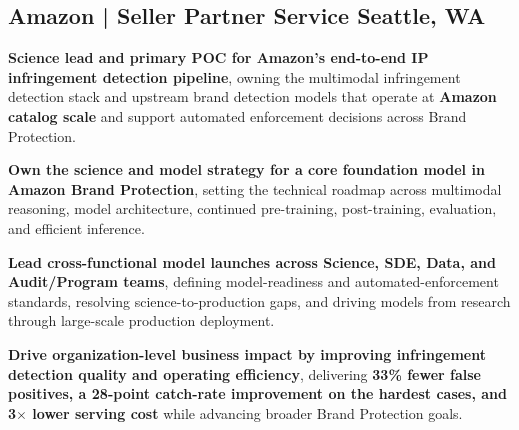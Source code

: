 \documentclass[]{Keval-resume}
\begin{document}
\subsection{Amazon | Seller Partner Service \hfill \normalfont S\lowercase{eattle}, WA}
\begin{cvitems}

\item
{\textbf{Science lead and primary POC for Amazon's end-to-end IP infringement detection pipeline}, owning the multimodal infringement detection stack and upstream brand detection models that operate at \textbf{Amazon catalog scale} and support automated enforcement decisions across Brand Protection.}

\item
{\textbf{Own the science and model strategy for a core foundation model in Amazon Brand Protection}, setting the technical roadmap across multimodal reasoning, model architecture, continued pre-training, post-training, evaluation, and efficient inference.}

\item
{\textbf{Lead cross-functional model launches across Science, SDE, Data, and Audit/Program teams}, defining model-readiness and automated-enforcement standards, resolving science-to-production gaps, and driving models from research through large-scale production deployment.}

\item
{\textbf{Drive organization-level business impact by improving infringement detection quality and operating efficiency}, delivering \textbf{33\% fewer false positives, a 28-point catch-rate improvement on the hardest cases, and 3$\times$ lower serving cost} while advancing broader Brand Protection goals.}

\end{cvitems}

\sectionsep
\end{document}
